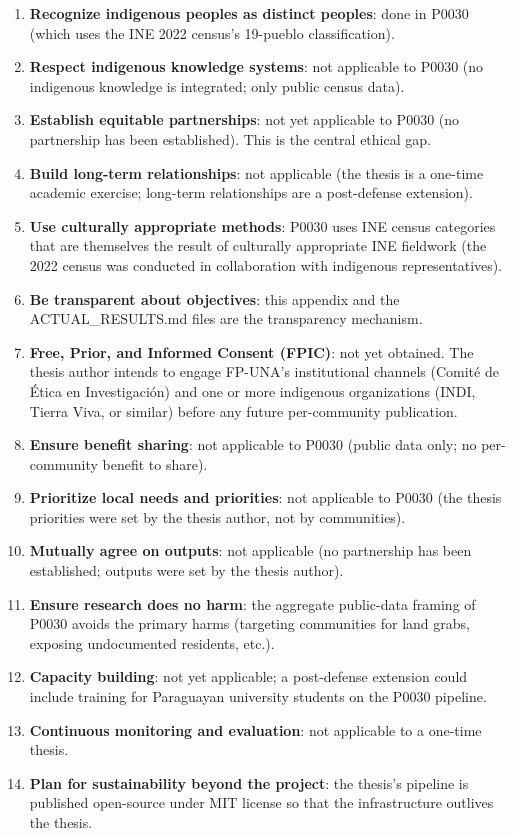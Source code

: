 \begin{enumerate}
    \item \textbf{Recognize indigenous peoples as distinct
      peoples}: done in P0030 (which uses the INE 2022 census's
      19-pueblo classification).
    \item \textbf{Respect indigenous knowledge systems}: not
      applicable to P0030 (no indigenous knowledge is integrated;
      only public census data).
    \item \textbf{Establish equitable partnerships}: not yet
      applicable to P0030 (no partnership has been established).
      This is the central ethical gap.
    \item \textbf{Build long-term relationships}: not applicable
      (the thesis is a one-time academic exercise; long-term
      relationships are a post-defense extension).
    \item \textbf{Use culturally appropriate methods}: P0030 uses
      INE census categories that are themselves the result of
      culturally appropriate INE fieldwork (the 2022 census was
      conducted in collaboration with indigenous representatives).
    \item \textbf{Be transparent about objectives}: this appendix
      and the ACTUAL\_RESULTS.md files are the transparency
      mechanism.
    \item \textbf{Free, Prior, and Informed Consent (FPIC)}:
      not yet obtained. The thesis author intends to engage
      FP-UNA's institutional channels (Comité de Ética en
      Investigación) and one or more indigenous organizations
      (INDI, Tierra Viva, or similar) before any future
      per-community publication.
    \item \textbf{Ensure benefit sharing}: not applicable to P0030
      (public data only; no per-community benefit to share).
    \item \textbf{Prioritize local needs and priorities}: not
      applicable to P0030 (the thesis priorities were set by the
      thesis author, not by communities).
    \item \textbf{Mutually agree on outputs}: not applicable
      (no partnership has been established; outputs were set
      by the thesis author).
    \item \textbf{Ensure research does no harm}: the aggregate
      public-data framing of P0030 avoids the primary harms
      (targeting communities for land grabs, exposing
      undocumented residents, etc.).
    \item \textbf{Capacity building}: not yet applicable; a
      post-defense extension could include training for
      Paraguayan university students on the P0030 pipeline.
    \item \textbf{Continuous monitoring and evaluation}: not
      applicable to a one-time thesis.
    \item \textbf{Plan for sustainability beyond the project}:
      the thesis's pipeline is published open-source under
      MIT license so that the infrastructure outlives the thesis.
\end{enumerate}

